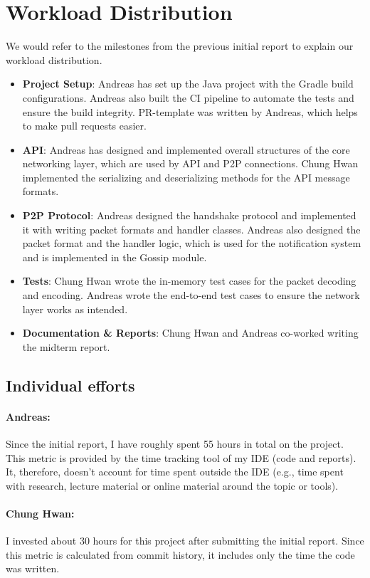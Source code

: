 \section{Workload Distribution}\label{sec:workload-distribution}

We would refer to the milestones from the previous initial report to explain our workload distribution.

\begin{itemize}
    \setlength\itemsep{0em}
    \item \textbf{Project Setup}:
    Andreas has set up the Java project with the Gradle build configurations.
    Andreas also built the CI pipeline to automate the tests and ensure the build integrity.
    PR-template was written by Andreas, which helps to make pull requests easier.
    \item \textbf{API}:
    Andreas has designed and implemented overall structures of the core networking layer,
    which are used by API and P2P connections.
    Chung Hwan implemented the serializing and deserializing methods for the API message formats.
    \item \textbf{P2P Protocol}:
    Andreas designed the handshake protocol and implemented it with writing packet formats and handler classes.
    Andreas also designed the packet format and the handler logic, which is used for the notification system
    and is implemented in the Gossip module.
    \item \textbf{Tests}:
    Chung Hwan wrote the in-memory test cases for the packet decoding and encoding.
    Andreas wrote the end-to-end test cases to ensure the network layer works as intended.
    \item \textbf{Documentation \& Reports}:
    Chung Hwan and Andreas co-worked writing the midterm report.
\end{itemize}

\subsection{Individual efforts}\label{subsec:individual-efforts}

\paragraph{Andreas:} Since the initial report, I have roughly spent 55 hours in total on the project.
This metric is provided by the time tracking tool of my IDE (code and reports).
It, therefore, doesn't account for time spent outside the
IDE  (e.g., time spent with research, lecture material or online material around the topic
or tools).

\paragraph{Chung Hwan:} I invested about 30 hours for this project after submitting the initial report.
Since this metric is calculated from commit history, it includes only the time the code was written.

